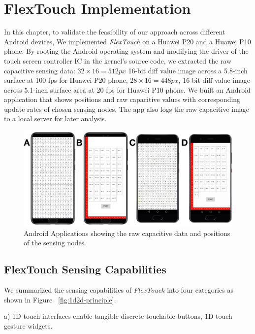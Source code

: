 \chapter{FlexTouch Implementation}

In this chapter, to validate the feasibility of our approach across different Android devices, We implemented \textit{FlexTouch} on a Huawei P20 and a Huawei P10 phone. By rooting the Android operating system and modifying the driver of the touch screen controller IC in the kernel's source code, we extracted the raw capacitive sensing data: $32 \times 16 = 512 px$ 16-bit diff value image across a 5.8-inch surface at 100 fps for Huawei P20 phone, $28 \times 16 = 448 px$, 16-bit diff value image across 5.1-inch surface area at 20 fps for Huawei P10 phone. We built an Android application that shows positions and raw capacitive values with corresponding update rates of chosen sensing nodes. The app also logs the raw capacitive image to a local server for later analysis.

\begin{figure}[ht]
    \centering
      \includegraphics[width=0.95\columnwidth]{figures/rawdata.png}
      \setlength{\belowcaptionskip}{-6pt}
      \caption{Android Applications showing the raw capacitive data and positions of the sensing nodes.}
      \label{fig:Android Applications showing the raw capacitive data and positions of the sensing nodes.}
\end{figure}

\section{FlexTouch Sensing Capabilities}
We summarized the sensing capabilities of \textit{FlexTouch} into four categories as shown in Figure ~\ref{fig:1d2d-principle}. 

a) 1D touch interfaces enable tangible discrete touchable buttons, 1D touch gesture widgets.

